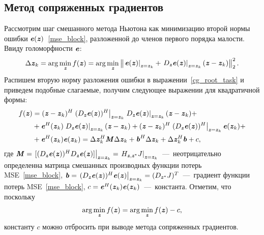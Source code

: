 \subsection{Метод сопряженных градиентов} \label{subsec:conj_grad}
Рассмотрим шаг смешанного метода Ньютона как минимизацию второй нормы ошибки $\bit{e}(\bit{z})$~\eqref{mse_block}, разложенной до членов первого порядка малости. Ввиду голоморфности $\bit{e}$:
\begin{equation}
	\Delta\bit{z}_k=\arg\min_{\bit{z}}f(\bit{z})=
	\arg\min_{\bit{z}}\begin{Vmatrix}
		\left. \bit{e}(\bit{z}) \right|_{\bit{z} = \bit{z}_k}+\left. D_{\bit{z}}\bit{e}(\bit{z})\right|_{\bit{z} = \bit{z}_k}(\bit{z}-\bit{z}_k)
	\end{Vmatrix}_2^2.
	\label{cg_root_task}
\end{equation}
Распишем вторую норму разложения ошибки в выражении~\eqref{cg_root_task} и приведем подобные слагаемые, получим следующее выражении для квадратичной формы:
\begin{align}
	f(\bit{z})&=(\bit{z}-\bit{z}_k)^H
	\left. (D_{\bit{z}}\bit{e}(\bit{z}))^H\right|_{\bit{z}=\bit{z}_k}
	\left. D_{\bit{z}}\bit{e}(\bit{z})\right|_{\bit{z}=\bit{z}_k}
	(\bit{z}-\bit{z}_k)+ \nonumber \\
	&+\bit{e}^H(\bit{z}_k)
	\left. D_{\bit{z}}\bit{e}(\bit{z})\right|_{\bit{z}=\bit{z}_k}(\bit{z}-\bit{z}_k)+
	(\bit{z}-\bit{z}_k)^H\left. (D_{\bit{z}}\bit{e}(\bit{z}))^H\right|_{\bit{z}=\bit{z}_k}\bit{e}(\bit{z}_k)+ \nonumber \\
	&+\bit{e}^H(\bit{z}_k)\bit{e}(\bit{z}_k)=
	\Delta\bit{z}_k^H\bit{M}\Delta\bit{z}_k+
	\bit{b}^H\Delta\bit{z}_k+\Delta\bit{z}_k^H\bit{b}+c,
	\label{quadratic_form}
\end{align}
где $\bit{M}=\left. [(D_{\bit{z}}\bit{e}(\bit{z}))^HD_{\bit{z}}\bit{e}(\bit{z})]\right|_{\bit{z}=\bit{z}_k}=\left. H_{\bit{z}, \bit{z}^*}J\right|_{\bit{z}=\bit{z}_k}$~---~неотрицательно определенна матрица смешанных производных функции потерь MSE~\eqref{mse_block}, $\bit{b}=\left. (D_{\bit{z}}\bit{e}(\bit{z}))^H\bit{e}(\bit{z}) \right|_{\bit{z}=\bit{z}_k}=(D_{\bit{z}^*}J)^T$~---~градиент функции потерь MSE~\eqref{mse_block}, $c=\bit{e}^H(\bit{z}_k)\bit{e}(\bit{z}_k)$~---~константа. Отметим, что поскольку 
\begin{equation}
	\arg\min_{\bit{z}}f(\bit{z})=\arg\min_{\bit{z}}f(\bit{z})-c,
	\label{get_rid_of_const}
\end{equation}
константу $c$ можно отбросить при выводе метода сопряженных градиентов.

